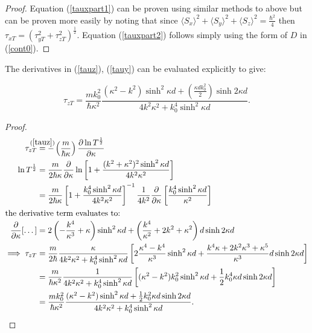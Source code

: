 \documentclass{article}
\begin{document}
\begin{proof} Equation (\ref{tauxpart1}) can be proven using similar methods to above but can be proven more easily by noting that since $\langle S_x \rangle^2 + \langle S_y \rangle^2 + \langle S_z \rangle^2 = \frac{\hbar^2}{4}$ then $\tau_{xT} = (\tau_{yT}^2+\tau_{zT}^2)^\frac{1}{2}$. Equation (\ref{tauxpart2}) follows simply using the form of $D$ in (\ref{cont0}).
\end{proof}

\noindent The derivatives in (\ref{tauz}), (\ref{tauy}) can be evaluated explicitly to give:

\begin{equation}
	\tau_{zT} = \frac{mk_0^2}{\hbar\kappa^2}\frac{(\kappa^2-k^2)\sinh^2{\kappa d}+\left(\frac{\kappa d k_0^2}{2}\right)\sinh{2\kappa d}}{4k^2\kappa^2+k_0^4\sinh^2{\kappa d}}.
\end{equation}

\begin{proof}
\begin{subequations}
\begin{align}
	\tau_{zT} &\stackrel{\mathclap{(\ref{tauz})}}{=} -\left(\frac{m}{\hbar\kappa}\right)\frac{\partial \ln{T^{\frac{1}{2}}}}{\partial\kappa} \\
	\ln{T^{\frac{1}{2}}}&=\frac{m}{2\hbar\kappa}\frac{\partial}{\partial\kappa}\ln{\left[1+\frac{(k^2+\kappa^2)^2\sinh^2{\kappa d}}{4k^2\kappa^2}\right]} \\
			    &=\frac{m}{2\hbar\kappa}\left[1+\frac{k_0^4\sinh^2{\kappa d}}{4k^2\kappa^2}\right]^{-1}\frac{1}{4k^2}\frac{\partial}{\partial\kappa}\left[\frac{k_0^4\sinh^2{\kappa d}}{\kappa^2}\right]\\ \intertext{the derivative term evaluates to:}
	\frac{\partial}{\partial\kappa}[\dots]&=2\left(-\frac{k^4}{\kappa^3}+\kappa\right)\sinh^2{\kappa d}+\left(\frac{k^4}{\kappa^2}+2k^2+\kappa^2\right)d\sinh{2\kappa d} \\
	\implies \tau_{zT} &= \frac{m}{2\hbar} \frac{\kappa}{4k^2\kappa^2+k_0^4\sinh^2{\kappa d}}\left[2\frac{\kappa^4-k^4}{\kappa^3}\sinh^2{\kappa d}+\frac{k^4\kappa+2k^2\kappa^3+\kappa^5}{\kappa^3}d\sinh{2\kappa d}\right] \\
			&= \frac{m}{\hbar\kappa^2} \frac{1}{4k^2\kappa^2+k_0^4\sinh^2{\kappa d}}\left[(\kappa^2-k^2)k_0^2\sinh^2{\kappa d}+\frac{1}{2}k_0^4\kappa d\sinh{2\kappa d}\right] \\
			&= \frac{mk_0^2}{\hbar\kappa^2}\frac{(\kappa^2-k^2)\sinh^2{\kappa d}+\frac{1}{2}k_0^2\kappa d\sinh{2\kappa d}}{4k^2\kappa^2+k_0^4\sinh^2{\kappa d}}.
\end{align}
\end{subequations}
\end{proof}
\end{document}
